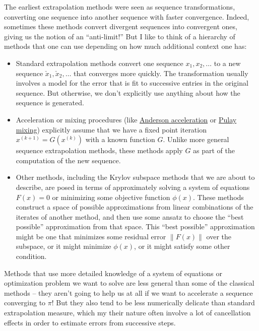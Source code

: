 \documentclass[12pt, leqno]{article}
\begin{document}
The earliest extrapolation methods were seen as sequence
transformations, converting one sequence into another sequence with
faster convergence.  Indeed, sometimes these methods convert divergent
sequences into convergent ones, giving us the notion of an
``anti-limit!''  But I like to think of a hierarchy of methods that one
can use depending on how much additional context one has:
\begin{itemize}
\item
  Standard extrapolation methods convert one sequence $x_1, x_2, \ldots$
  to a new sequence $\check{x}_1, \check{x}_2, \ldots$ that converges
  more quickly.  The transformation usually involves a model for the
  error that is fit to successive entries in the original sequence.  But
  otherwise, we don't explicitly use anything about how the sequence is
  generated.
\item Acceleration or mixing procedures (like
  \href{https://epubs.siam.org/doi/10.1137/10078356X}{Anderson acceleration}
  or
  \href{https://en.wikipedia.org/wiki/DIIS}{Pulay mixing})
  explicitly assume that we have a fixed point iteration
  $x^{(k+1)} = G(x^{(k)})$ with a known function $G$.
  Unlike more general sequence
  extrapolation methods, these methods apply $G$ as part of the
  computation of the new sequence.
\item
  Other methods, including the Krylov subspace methods that we are
  about to describe, are posed in terms of approximately solving a
  system of equations $F(x) = 0$ or minimizing some objective function
  $\phi(x)$.  These methods construct a space of possible
  approximations from linear combinations of the iterates of another
  method, and then use some ansatz to choose the ``best possible''
  approximation from that space.  This ``best possible'' approximation
  might be one that minimizes some residual error $\|F(x)\|$ over the
  subspace, or it might minimize $\phi(x)$, or it might satisfy some
  other condition.
\end{itemize}

Methods that use more detailed knowledge of a system of equations or
optimization problem we want to solve are less general than some of
the classical methods -- they aren't going to help us at all if we
want to accelerate a sequence converging to $\pi$!  But they also tend
to be less numerically delicate than standard extrapolation measure,
which my their nature often involve a lot of cancellation effects in
order to estimate errors from successive steps.
\end{document}
